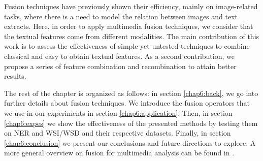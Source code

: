 Fusion techniques have previously shown their efficiency, mainly on image-related tasks, where there is a need to model the relation  between images and text extracts.
%
%
Here, in order to apply multimedia fusion techniques, we consider that the textual features  come from different modalities. The main contribution of this work is to assess the effectiveness of simple yet untested techniques to combine classical and easy to obtain textual features. As a second contribution, we propose a series of feature combination and recombination to attain better results. 

The rest of the chapter is organized as follows: in section \ref{chap6:back}, we go into further details about fusion techniques. 
We introduce the fusion operators that we use in our experiments in section \ref{chap6:application}. Then, in section \ref{chap6:expes} we show the effectiveness of the presented methods by testing them on NER and WSI/WSD and their respective datasets. Finally, in section \ref{chap6:conclusion} we present our conclusions and future directions to explore. A more general overview on fusion for multimedia analysis can be found in \cite{AtreyHEK10}.

